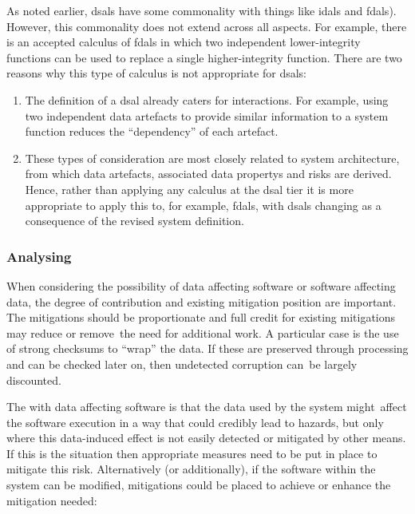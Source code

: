 As noted earlier, \glspl{dsal} have some commonality with things like \cbstart\glspl{idal} and \glspl{fdal})\cbend. However, this commonality does not extend across all aspects. For example, there is an accepted calculus of \glspl{fdal} in which two independent lower-\gls{integrity} functions can be used to replace a single higher-\gls{integrity} function. There are two reasons why this type of calculus is not appropriate for \glspl{dsal}:

\begin{enumerate}
  \item The definition of a \gls{dsal} already caters for interactions. For example, using two independent \glspl{data artefact} to provide similar \gls{information} to a system function reduces the ``dependency'' of each artefact.
  \item These types of consideration are most closely related to system architecture, from which \glspl{data artefact}, associated \glspl{data property} and risks are derived. Hence, rather than applying any calculus at the \gls{dsal} tier it is more appropriate to apply this to, for example, \glspl{fdal}, with \glspl{dsal} changing as a consequence of the revised system definition.
\end{enumerate}

\subsubsection{Analysing }
When considering the possibility of data affecting software or software affecting data, the degree of contribution and existing \gls{mitigation} position are important. The \glspl{mitigation} should be proportionate and full credit for existing \glspl{mitigation} may reduce or \cbstart remove\cbend\ the need for additional work. A particular case is the use of strong checksums to ``wrap'' the data. If these are preserved through processing and can be checked later on, then undetected  corruption \cbstart can\cbend\ be largely discounted.

\cbstart The with data affecting software is that the data used by the system might\cbend\ affect the software execution in a way that could credibly lead to \glspl{hazard}, but only where this data-induced effect is not easily detected or mitigated by other means. If this is the situation then appropriate measures need to be put in place  to mitigate this risk. Alternatively (or additionally), if the software within the system can be modified, \glspl{mitigation} could be placed  to achieve or enhance the \gls{mitigation} needed:

